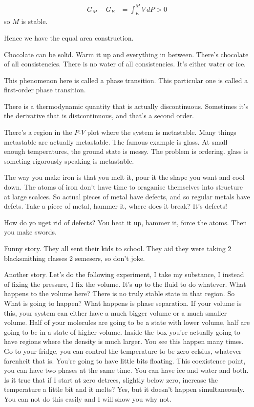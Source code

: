 \begin{align}
    G_M - G_E
    &=
    \int_{E}^{M} V\, dP > 0
\end{align}
so $M$ is stable.

Hence we have the equal area construction.

Chocolate can be solid.
Warm it  up and everything in between.
There's chocolate of all consistencies.
There is no water of all consistencies.
It's either water or ice.

This phenomenon here is called a phase transition.
This particular one is called a first-order phase transition.

There is a thermodynamic quantity that is actually discontinuous.
Sometimes it's the derivative that is distcontinuous,
and that's a second order.

There's a region in the $P$-$V$ plot where the system is metastable.
Many things metastable are actually metastable.
The famous example is glass.
At small enough temperatures,
the ground state is messy.
The problem is ordering.
glass is someting rigorously speaking is metastable.

The way you make iron is that you melt it,
pour it the shape you want and cool down.
The atoms of iron don't have time to oraganise themselves into structure at
large scalces.
So actual pieces of metal have defects,
and so regular metals have defets.
Take a piece of metal,
hammer it,
where does it break?
It's defects!

How do yo uget rid of defects?
You heat it up,
hammer it,
force the atoms.
Then you make swords.

Funny story.
They all sent their kids to school.
They aid they were taking 2 blacksmithing classes 2 semesers,
so don't joke.

Another story.
Let's do the following experiment,
I take my substance,
I instead of fixing the pressure,
I fix the volume.
It's up to the fluid to do whatever.
What happens to the volume here?
There is no truly stable state in that region.
So What is going to happen?
What happens is phase separation.
If your volume is this,
your system can either have a much bigger volume or a much smaller volume.
Half of your molecules are going to be a state with lower volume,
half are going to be in a state of higher volume.
Inside the box you're actually going to have regions where the density is much
larger.
You see this happen many times.
Go to your fridge,
you can control the temperature to be zero celsius,
whatever farenheit that is.
You're going to have little bits floating.
This coexistence point,
you can have two phases at the same time.
You can have ice and water and both.
Is it true that if I start at zero detrees,
slightly below zero,
increase the temperature a little bit and it melts?
Yes,
but it doesn't happen simultaneously.
You can not do this easily and I will show you why not.


